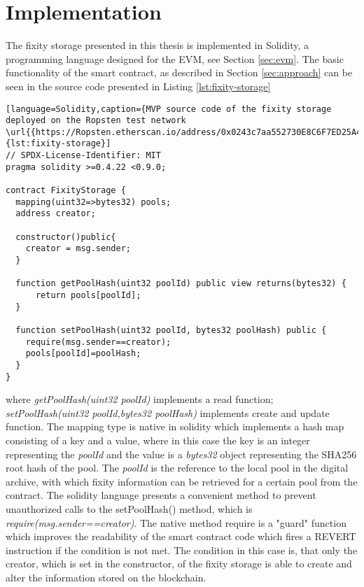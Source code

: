 \section{Implementation}
\label{sec:implementation}
The fixity storage presented in this thesis is implemented in Solidity, a programming language designed for the EVM, see Section \ref{sec:evm}.
The basic functionality of the smart contract, as described in Section \ref{sec:approach} can be seen in the source code presented in Listing \ref{lst:fixity-storage}
\begin{lstlisting}[language=Solidity,caption={MVP source code of the fixity storage deployed on the Ropsten test network \url{{https://Ropsten.etherscan.io/address/0x0243c7aa552730E8C6F7ED25A480a7C0c88a70f0}},label={lst:fixity-storage}]
// SPDX-License-Identifier: MIT
pragma solidity >=0.4.22 <0.9.0;

contract FixityStorage {
  mapping(uint32=>bytes32) pools;
  address creator;

  constructor()public{
    creator = msg.sender;
  }

  function getPoolHash(uint32 poolId) public view returns(bytes32) {
      return pools[poolId];
  }

  function setPoolHash(uint32 poolId, bytes32 poolHash) public {
    require(msg.sender==creator);
    pools[poolId]=poolHash;
  }
}
\end{lstlisting}
where \textit{getPoolHash(uint32 poolId)} implements a read function; \textit{setPoolHash(uint32 poolId,bytes32 poolHash)} implements create and update function. The mapping type is native in solidity which implements a hash map consisting of a key and a value, where in this case the key is an integer representing the \textit{poolId} and the value is a \textit{bytes32} object representing the SHA256 root hash of the pool. The \textit{poolId} is the reference to the local pool in the digital archive, with which fixity information can be retrieved for a certain pool from the contract. The solidity language presents a convenient  method to prevent unauthorized calls to the setPoolHash() method, which is \textit{require(msg.sender==creator)}. The native method require is a "guard" function which improves the readability of the smart contract code which fires a REVERT instruction if the condition is not met. The condition in this case is, that only the creator, which is set in the constructor, of the fixity storage is able to create and alter the information stored on the blockchain.

